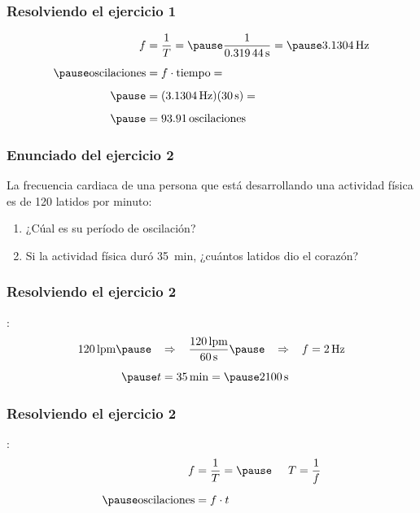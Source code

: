 \documentclass[14pt]{beamer}
\begin{document}
\begin{frame}
\frametitle{Resolviendo el ejercicio 1}
\pause
\begin{eqnarray*}
\begin{aligned}
f &= \dfrac{1}{T} = \pause \dfrac{1}{\SI{0.31944}{\second}} = \pause \SI{3.1304}{\hertz} \\[0.5em] \pause
\text{oscilaciones} &= f \cdot \text{tiempo} = \\[0.5em] \pause
&= (\SI{3.1304}{\hertz})(\SI{30}{\second}) = \\[0.5em] \pause 
&= 93.91 \, \text{oscilaciones}
\end{aligned}
\end{eqnarray*}
\end{frame}
\begin{frame}
\frametitle{Enunciado del ejercicio 2}
La frecuencia cardiaca de una persona que está desarrollando una actividad física es de 120 latidos por minuto:
\begin{enumerate}[<+->]
\item ¿Cúal es su período de oscilación?
\item Si la actividad física duró \SI{35}{\minute}, ¿cuántos latidos dio el corazón?
\end{enumerate}
\end{frame}
\begin{frame}
\frametitle{Resolviendo el ejercicio 2}
:
\pause
\begin{eqnarray*}
\begin{aligned}
120 \, \text{lpm} \pause \hspace{0.3cm} &\Rightarrow \hspace{0.3cm} \dfrac{120 \, \text{lpm}}{\SI{60}{\second}} \pause \hspace{0.3cm} \Rightarrow \hspace{0.3cm} f = \SI{2}{\hertz} \\[0.5em] \pause
t &= \SI{35}{\minute} = \pause \SI{2100}{\second}
\end{aligned}
\end{eqnarray*}
\end{frame}
\begin{frame}
\frametitle{Resolviendo el ejercicio 2}
:
\begin{eqnarray*}
\begin{aligned}
f &= \dfrac{1}{T} = \pause \hspace{0.5cm} T = \dfrac{1}{f} \\[0.5em] \pause
\text{oscilaciones} &= f \cdot t 
\end{aligned}
\end{eqnarray*}
\end{frame}
\end{document}
